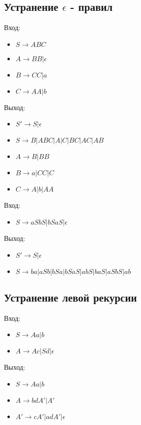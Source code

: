 		\subsection{Устранение $\epsilon$ - правил}
			Вход:
			\begin{itemize}
				\item $S \rightarrow ABC $
				\item $A \rightarrow BB | \epsilon $
				\item $B \rightarrow CC | a $
				\item $C \rightarrow AA | b $
			\end{itemize}

			Выход:
			\begin{itemize}
				\item $S' \rightarrow S | \epsilon $
				\item $S \rightarrow B | ABC | A | C | BC | AC | AB $
				\item $A \rightarrow B | BB $
				\item $B \rightarrow a | CC | C $
				\item $C \rightarrow A | b | AA $
			\end{itemize}

			Вход:
			\begin{itemize}
				\item $S \rightarrow aSbS | bSaS | \epsilon $
			\end{itemize}

			Выход:
			\begin{itemize}
				\item $S' \rightarrow S | \epsilon $
				\item $S \rightarrow ba | aSb | bSa | bSaS | abS | baS | aSbS | ab $
			\end{itemize}

		\subsection{Устранение левой рекурсии}
			Вход:
			\begin{itemize}
				\item $S \rightarrow Aa | b $
				\item $A \rightarrow Ac | Sd | \epsilon$
			\end{itemize}

			Выход:
			\begin{itemize}
				\item $S \rightarrow Aa | b $
				\item $A \rightarrow bdA' | A' $
				\item $A' \rightarrow cA' | adA' | \epsilon $
			\end{itemize}

